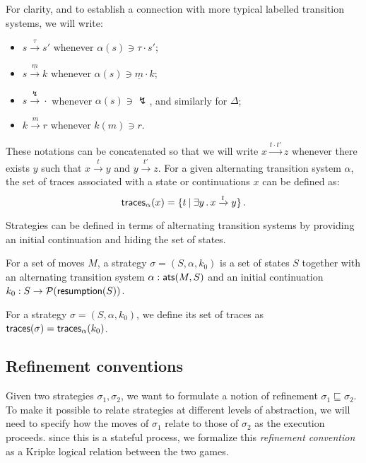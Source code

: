For clarity,
and to establish a connection with more typical
labelled transition systems,
we will write:
\begin{itemize}
\item $s \xrightarrow{\tau} s'$ whenever $\alpha(s) \ni \tau \cdot s'$;
\item $s \xrightarrow{\underline{m}} k$
	whenever $\alpha(s) \ni \underline{m} \cdot k$;
\item $s \xrightarrow{\lightning} {\cdot}$
	whenever $\alpha(s) \ni \lightning$,
	and similarly for $\Delta$;
\item $k \xrightarrow{m} r$ whenever $k(m) \ni r$.
\end{itemize}
These notations can be concatenated so that
we will write $x \xrightarrow{t \cdot t'} z$
whenever there exists $y$ such that $x \xrightarrow{t} y$ and
$y \xrightarrow{t'} z$.
For a given alternating transition system $\alpha$,
the set of traces associated with a state or continuations $x$
can be defined as:
\[
     \mathsf{traces} _\alpha(x) =
	\{ t \:|\: \exists y \,.\, x \xrightarrow{t} y \} \,.
\]

Strategies can be defined in terms of alternating transition systems
by providing an initial continuation and hiding the set of states.

\begin{definition}[Strategy]
For a set of moves $M$,
a strategy $\sigma = (S, \alpha, k_0)$
is a set of states $S$ together with
an alternating transition system $\alpha :  \mathsf{ats} (M, S)$ and
an initial continuation $k_0 : S \rightarrow \mathcal{P}( \mathsf{resumption} (S))$.
\end{definition}

For a strategy $\sigma = (S, \alpha, k_0)$,
we define its set of traces as
$ \mathsf{traces} (\sigma) =  \mathsf{traces} _\alpha (k_0)$.

\subsection{Refinement conventions}

Given two strategies $\sigma_1, \sigma_2$,
we want to formulate a notion of refinement
$\sigma_1 \sqsubseteq \sigma_2$.
To make it possible to relate strategies at different
levels of abstraction,
we will need to specify how the moves of $\sigma_1$
relate to those of $\sigma_2$
as the execution proceeds.
since this is a stateful process,
we formalize this \emph{refinement convention}
as a Kripke logical relation between the two games.

